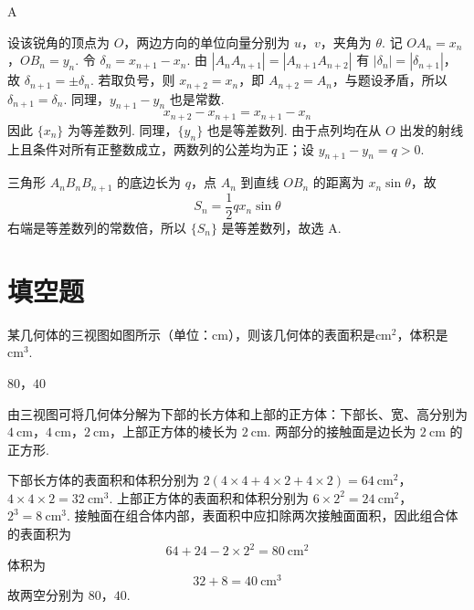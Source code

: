 \begin{answer}
A
\end{answer}

\begin{solution}
设该锐角的顶点为 \(O\)，两边方向的单位向量分别为 \(u\)，\(v\)，夹角为 \(\theta\). 记 \(OA_n=x_n\)，\(OB_n=y_n\). 令 \(\delta_n=x_{n+1}-x_n\). 由 \(|A_nA_{n+1}|=|A_{n+1}A_{n+2}|\) 有 \(|\delta_n|=|\delta_{n+1}|\)，故 \(\delta_{n+1}=\pm\delta_n\). 若取负号，则 \(x_{n+2}=x_n\)，即 \(A_{n+2}=A_n\)，与题设矛盾，所以 \(\delta_{n+1}=\delta_n\). 同理，\(y_{n+1}-y_n\) 也是常数.
\[
x_{n+2}-x_{n+1}=x_{n+1}-x_n
\]
因此 \(\{x_n\}\) 为等差数列. 同理，\(\{y_n\}\) 也是等差数列. 由于点列均在从 \(O\) 出发的射线上且条件对所有正整数成立，两数列的公差均为正；设 \(y_{n+1}-y_n=q>0\).

三角形 \(A_nB_nB_{n+1}\) 的底边长为 \(q\)，点 \(A_n\) 到直线 \(OB_n\) 的距离为 \(x_n\sin\theta\)，故
\[
S_n=\frac12q x_n\sin\theta
\]
右端是等差数列的常数倍，所以 \(\{S_n\}\) 是等差数列，故选 A.
\end{solution}

\section{填空题}

\begin{problem}
某几何体的三视图如图所示（单位：\(\mathrm{cm}\)），则该几何体的表面积是\fillinblank{}\(\mathrm{cm}^2\)，体积是\fillinblank{}\(\mathrm{cm}^3\).

\end{problem}

\begin{answer}
\(80\)，\(40\)
\end{answer}

\begin{solution}
由三视图可将几何体分解为下部的长方体和上部的正方体：下部长、宽、高分别为 \(4\mathrm{~cm}\)，\(4\mathrm{~cm}\)，\(2\mathrm{~cm}\)，上部正方体的棱长为 \(2\mathrm{~cm}\). 两部分的接触面是边长为 \(2\mathrm{~cm}\) 的正方形.

下部长方体的表面积和体积分别为
\(2(4\times4+4\times2+4\times2)=64\mathrm{~cm}^2\)，\(4\times4\times2=32\mathrm{~cm}^3\).
上部正方体的表面积和体积分别为
\(6\times2^2=24\mathrm{~cm}^2\)，\(2^3=8\mathrm{~cm}^3\).
接触面在组合体内部，表面积中应扣除两次接触面面积，因此组合体的表面积为
\[
64+24-2\times2^2=80\mathrm{~cm}^2
\]
体积为
\[
32+8=40\mathrm{~cm}^3
\]
故两空分别为 \(80\)，\(40\).
\end{solution}

